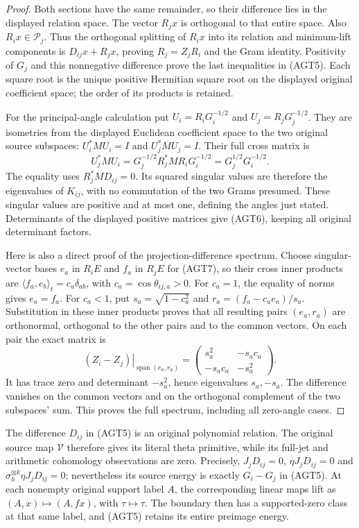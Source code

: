 \documentclass{article}
\newcommand{\cP}{\mathcal P}
\begin{document}
\begin{proof}
Both sections have the same remainder, so their difference lies
in the displayed relation space. The vector $R_jx$ is orthogonal
to that entire space. Also $R_ix\in\cP_j$. Thus the orthogonal
splitting of $R_ix$ into its relation and minimum-lift components
is $D_{ij}x+R_jx$, proving $R_j=Z_jR_i$ and the Gram identity.
Positivity of $G_j$ and this nonnegative difference prove the
last inequalities in (AGT5). Each square root is the unique
positive Hermitian square root on the displayed original
coefficient space; the order of its products is retained.

For the principal-angle calculation put
$U_i=R_iG_i^{-1/2}$ and $U_j=R_jG_j^{-1/2}$.
They are isometries from the displayed Euclidean coefficient
space to the two original source subspaces: $U_i^*MU_i=I$
and $U_j^*MU_j=I$. Their full cross matrix is
\[
 U_j^*MU_i=G_j^{-1/2}R_j^*MR_iG_i^{-1/2}
          =G_j^{1/2}G_i^{-1/2}.
 \tag{AGT7}
\]
The equality uses $R_j^*MD_{ij}=0$. Its squared singular values
are therefore the eigenvalues of $K_{ij}$, with no commutation
of the two Grams presumed. These singular values are positive
and at most one, defining the angles just stated. Determinants
of the displayed positive matrices give (AGT6), keeping all
original determinant factors.

Here is also a direct proof of the projection-difference spectrum.
Choose singular-vector bases $e_a$ in $R_iE$ and $f_a$ in $R_jE$
for (AGT7), so their cross inner products are
$\langle f_a,e_b\rangle_t=c_a\delta_{ab}$, with
$c_a=\cos\theta_{ij,a}>0$. For $c_a=1$, the equality of norms
gives $e_a=f_a$. For $c_a<1$, put
$s_a=\sqrt{1-c_a^2}$ and $r_a=(f_a-c_ae_a)/s_a$.
Substitution in these inner products proves that all resulting
pairs $(e_a,r_a)$ are orthonormal, orthogonal to the other pairs
and to the common vectors. On each pair the exact matrix is
\[
 \left.(Z_i-Z_j)\right|_{\operatorname{span}(e_a,r_a)}
 =\begin{pmatrix}s_a^2&-s_ac_a\\-s_ac_a&-s_a^2\end{pmatrix}.
 \tag{AGT8}
\]
It has trace zero and determinant $-s_a^2$, hence eigenvalues
$s_a,-s_a$. The difference vanishes on the common vectors
and on the orthogonal complement of the two subspaces' sum.
This proves the full spectrum, including all zero-angle cases.
\end{proof}

The difference $D_{ij}$ in (AGT5) is an original polynomial
relation. The original source map $\mathcal V$ therefore gives
its literal theta primitive, while its full-jet and arithmetic
cohomology observations are zero. Precisely,
$J_jD_{ij}=0$, $\eta J_jD_{ij}=0$ and
$\sigma_h^{\otimes k}\eta J_jD_{ij}=0$; nevertheless its
source energy is exactly $G_i-G_j$ in (AGT5).
At each nonempty original support label $A$, the corresponding
linear maps lift as $(A,x)\mapsto(A,fx)$, with $\tau\mapsto\tau$.
The boundary then has a supported-zero class at that same
label, and (AGT5) retains its entire preimage energy.
\end{document}
